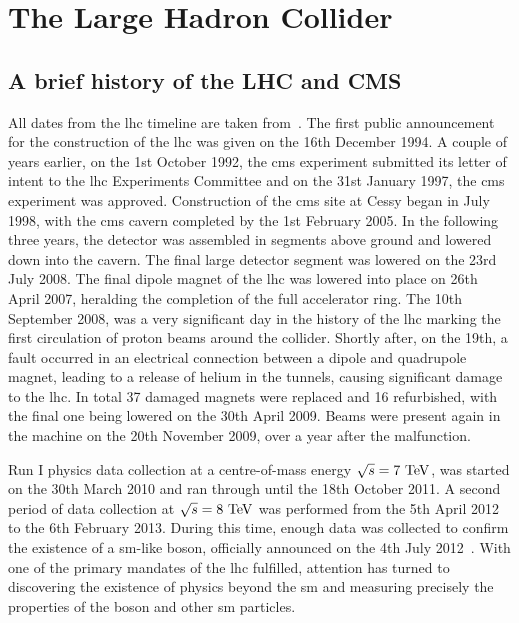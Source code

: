 \section{The Large Hadron Collider}
\label{sec:LHC}

\subsection{A brief history of the LHC and CMS}
\label{ssec:LHCHist}
All dates from the \acrshort{lhc} timeline are taken from~\cite{LHCtimeline}.
The first public announcement for the construction of the \acrshort{lhc} was given on the 16th December 1994. 
A couple of years earlier, on the 1st October 1992, the \acrshort{cms} experiment submitted its letter of intent to the \acrshort{lhc} Experiments Committee and on the 31st January 1997, the \acrshort{cms} experiment was approved.
Construction of the \acrshort{cms} site at Cessy began in July 1998, with the \acrshort{cms} cavern completed by the 1st February 2005.
In the following three years, the detector was assembled in segments above ground and lowered down into the cavern.
The final large detector segment was lowered on the 23rd July 2008.
The final dipole magnet of the \acrshort{lhc} was lowered into place on 26th April 2007, heralding the completion of the full accelerator ring.
The 10th September 2008, was a very significant day in the history of the \acrshort{lhc} marking the first circulation of proton beams around the collider. 
Shortly after, on the 19th, a fault occurred in an electrical connection between a dipole and quadrupole magnet, leading to a release of helium in the tunnels, causing significant damage to the \acrshort{lhc}. 
In total 37 damaged magnets were replaced and 16 refurbished, with the final one being lowered on the 30th April 2009. 
Beams were present again in the machine on the 20th November 2009, over a year after the malfunction. 

Run I physics data collection at a centre-of-mass energy $\sqrt{s}=7\mathrm{~Te\hspace{-.08em}V}^{}$, was started on the 30th March 2010 and ran through until the 18th October 2011. 
A second period of data collection at $\sqrt{s}=8\mathrm{~Te\hspace{-.08em}V}^{}$ was performed from the 5th April 2012 to the 6th February 2013. 
During this time, enough data was collected to confirm the existence of a \acrshort{sm}-like \Hboson{} boson, officially announced on the 4th July 2012~\cite{CMS:Higgs}.
With one of the primary mandates of the \acrshort{lhc} fulfilled, attention has turned to discovering the existence of physics beyond the \acrshort{sm} and measuring precisely the properties of the \Hboson{} boson and other \acrshort{sm} particles.

